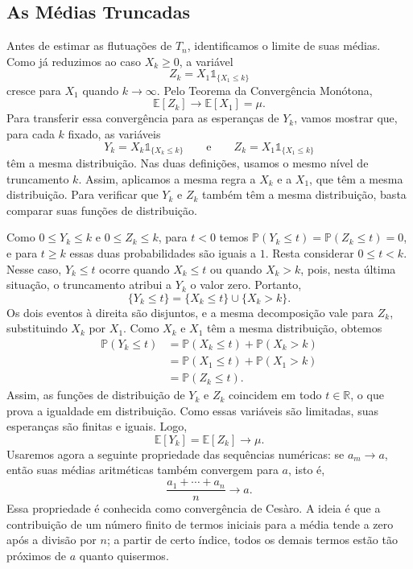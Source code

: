 \documentclass[12pt,portuguese]{article}
\theoremstyle{definition}
\theoremstyle{plainexercise}
\theoremstyle{starredexercise}
\theoremstyle{definition}
\begin{document}
\subsection{As Médias Truncadas}\label{subsec:medias-truncadas}

Antes de estimar as flutuações de $T_n$, identificamos o limite de suas médias.
Como já reduzimos ao caso $X_k\geqslant0$, a variável
\[
Z_k=X_1\mathds{1}_{\{X_1\leqslant k\}}
\]
cresce para $X_1$ quando $k\to\infty$. Pelo Teorema da Convergência Monótona,
\[
\mathbb{E}[Z_k]\longrightarrow\mathbb{E}[X_1]=\mu.
\]
Para transferir essa convergência para as esperanças de $Y_k$, vamos mostrar
que, para cada $k$ fixado, as variáveis
\[
Y_k=X_k\mathds{1}_{\{X_k\leqslant k\}}
\qquad\text{e}\qquad
Z_k=X_1\mathds{1}_{\{X_1\leqslant k\}}
\]
têm a mesma distribuição. Nas duas definições, usamos o mesmo nível de
truncamento $k$. Assim, aplicamos a mesma regra a $X_k$ e a $X_1$, que têm a
mesma distribuição. Para verificar que $Y_k$ e $Z_k$ também têm a mesma
distribuição, basta comparar suas funções de distribuição.

Como $0\leqslant Y_k\leqslant k$ e $0\leqslant Z_k\leqslant k$, para $t<0$
temos $\mathbb{P}(Y_k\leqslant t)=\mathbb{P}(Z_k\leqslant t)=0$, e para
$t\geqslant k$ essas duas probabilidades são iguais a $1$.
Resta considerar $0\leqslant t<k$. Nesse caso, $Y_k\leqslant t$ ocorre
quando $X_k\leqslant t$ ou quando $X_k>k$, pois, nesta última situação,
o truncamento atribui a $Y_k$ o valor zero. Portanto,
\[
\{Y_k\leqslant t\}
=\{X_k\leqslant t\}\cup\{X_k>k\}.
\]
Os dois eventos à direita são disjuntos, e a mesma decomposição vale para
$Z_k$, substituindo $X_k$ por $X_1$. Como $X_k$ e $X_1$ têm a mesma
distribuição, obtemos
\begin{align*}
\mathbb{P}(Y_k\leqslant t)
&=\mathbb{P}(X_k\leqslant t)+\mathbb{P}(X_k>k)
\\[0.3cm]
&=\mathbb{P}(X_1\leqslant t)+\mathbb{P}(X_1>k)
\\[0.3cm]
&=\mathbb{P}(Z_k\leqslant t).
\end{align*}
Assim, as funções de distribuição de $Y_k$ e $Z_k$ coincidem em todo
$t\in\mathbb{R}$, o que prova a igualdade em distribuição. Como essas
variáveis são limitadas, suas esperanças são finitas e iguais. Logo,
\[
\mathbb{E}[Y_k]=\mathbb{E}[Z_k]\longrightarrow\mu.
\]
Usaremos agora a seguinte propriedade das sequências numéricas: se
$a_m\to a$, então suas médias aritméticas também convergem para $a$, isto é,
\[
\frac{a_1+\cdots+a_n}{n}\longrightarrow a.
\]
Essa propriedade é conhecida como convergência de Cesàro. A ideia é que a
contribuição de um número finito de termos iniciais para a média tende a zero
após a divisão por $n$; a partir de certo índice, todos os demais termos
estão tão próximos de $a$ quanto quisermos.
\end{document}
